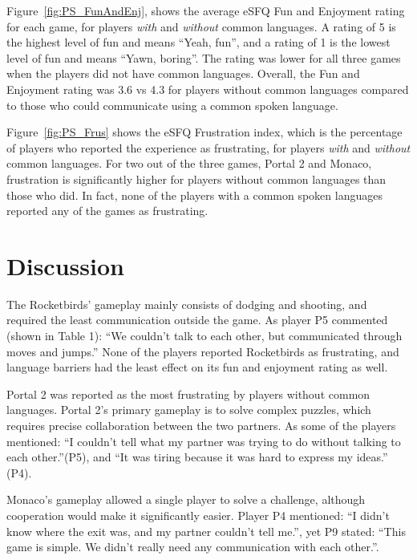 Figure~\ref{fig:PS_FunAndEnj}, shows the average eSFQ Fun and Enjoyment rating for each game, for players \textit{with} and \textit{without} common languages. 
A rating of 5 is the highest level of fun and means ``Yeah, fun'', and a rating of 1 is the lowest level of fun and means ``Yawn, boring''.
The rating was lower for all three games when the players did not have common languages. Overall, the Fun and Enjoyment rating was 3.6 vs 4.3 for players without common languages compared to those who could communicate using a common spoken language.

Figure~\ref{fig:PS_Frus} shows the eSFQ Frustration index, which is the percentage of players who reported the experience as frustrating, for players \textit{with} and \textit{without} common languages.
For two out of the three games, Portal 2 and Monaco, frustration is significantly higher for players without common languages than those who did. In fact, none of the players with a common spoken languages reported any of the games as frustrating. 


\section{Discussion}

The Rocketbirds' gameplay mainly consists of dodging and shooting, and required the least communication outside the game. As player P5 commented (shown in Table 1): ``We couldn't talk to each other, but communicated through moves and jumps.'' 
None of the players reported Rocketbirds as frustrating, and language barriers had the least effect on its fun and enjoyment rating as well.

Portal 2 was reported as the most frustrating by players without common languages. Portal 2's primary gameplay is to solve complex puzzles, which requires precise collaboration between the two partners. As some of the players mentioned: ``I couldn't tell what my partner was trying to do without talking to each other.''(P5), and ``It was tiring because it was hard to express my ideas.'' (P4).

Monaco's gameplay allowed a single player to solve a challenge, although cooperation would make it significantly easier. Player P4 mentioned: ``I didn't know where the exit was, and my partner couldn't tell me.'', yet P9 stated:  ``This game is simple. We didn't really need any communication with each other.''.



